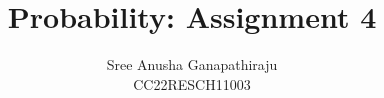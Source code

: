 \documentclass[journal,12pt,twocolumn]{IEEEtran}
\begin{document}
\makeatletter
{}
\makeatother

\let\StandardTheFigure\thefigure
\let\vec\mathbf
\let\j\jmath
\renewcommand{\thefigure}{\theproblem}



\def\putbox#1#2#3{\makebox[0in][l]{\makebox[#1][l]{}\raisebox{\baselineskip}[0in][0in]{\raisebox{#2}[0in][0in]{#3}}}}
     \def\rightbox#1{\makebox[0in][r]{#1}}
     \def\centbox#1{\makebox[0in]{#1}}
     \def\topbox#1{\raisebox{-\baselineskip}[0in][0in]{#1}}
     \def\midbox#1{\raisebox{-0.5\baselineskip}[0in][0in]{#1}}

\vspace{3cm}

\title{
	Probability: Assignment 4
}

\author{
	Sree Anusha Ganapathiraju\\
	CC22RESCH11003
}
\maketitle

\newpage

\tableofcontents

\bigskip

\renewcommand{\thefigure}{\theenumi}
\renewcommand{\thetable}{\theenumi}
%
%		

		\numberwithin{equation}{enumi}
\end{document}
